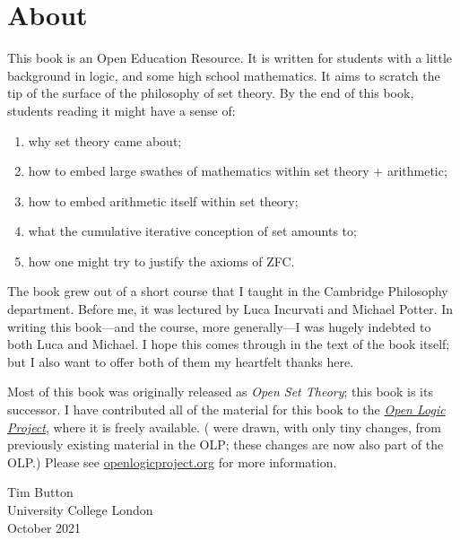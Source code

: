 \chapter*{About}

This book is an Open Education Resource. It is written for students
with a little background in logic, and some high school mathematics.
It aims to scratch the tip of the surface of the philosophy of set
theory. By the end of this book, students reading it might have a
sense of:
\begin{enumerate}
	\item why set theory came about; 
	\item how to embed large swathes of mathematics within set theory + arithmetic;
	\item how to embed arithmetic itself within set theory;
	\item what the cumulative iterative conception of set amounts to;
	\item how one might try to justify the axioms of ZFC.
\end{enumerate}
The book grew out of a short course that I taught in the Cambridge Philosophy department. Before me, it was lectured by Luca Incurvati and Michael
Potter. In writing this book---and the course, more generally---I was
hugely indebted to both Luca and Michael. I hope this comes through in the text of the book itself; but I also want to offer both of them
my heartfelt thanks here.

Most of this book was originally released as \emph{Open
Set Theory}; this book is its successor. I have contributed all of the material for this book to the \href{http://openlogicproject.org}{\emph{Open Logic Project}}, where it is freely available. ( were drawn, with only tiny
changes, from previously existing material in the OLP; these changes are now also part of the OLP.) Please see
\href{http://openlogicproject.org/}{openlogicproject.org} for more
information.

\begin{flushright}
Tim Button
\\University College London
\\October 2021
\end{flushright}